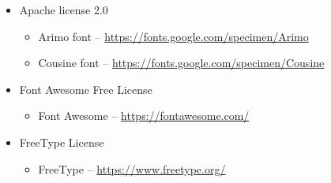 \documentclass[hidelinks,titlepage,a4paper]{article}
\begin{document}
\begin{itemize}
\item Apache license 2.0
\begin{itemize}
\item Arimo font -- \url{https://fonts.google.com/specimen/Arimo}
\item Cousine font -- \url{https://fonts.google.com/specimen/Cousine}
\end{itemize}

\item Font Awesome Free License
\begin{itemize}
\item Font Awesome -- \url{https://fontawesome.com/}
\end{itemize}

\item FreeType License
\begin{itemize}
\item FreeType -- \url{https://www.freetype.org/}
\end{itemize}

\end{itemize}
\end{document}
